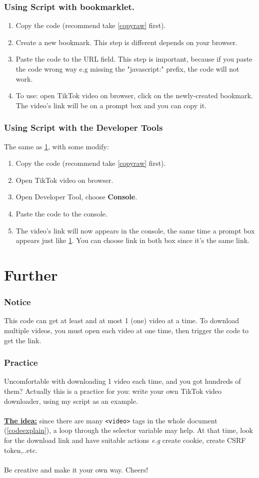 \documentclass{article}
\begin{document}
\section{Using Script with bookmarklet.}\label{bookmarklet}
\begin{enumerate}
\item Copy the code (recommend take \ref{copyraw} first).
\item Create a new bookmark. This step is different depends on your browser.
\item Paste the code to the URL field. This step is important, because if you paste the code wrong way e.g missing the "javascript:" prefix, the code will not work.
\item To use: open TikTok video on browser, click on the newly-created bookmark. The video's link will be on a prompt box and you can copy it.
\end{enumerate}

\section{Using Script with the Developer Tools}
The same as \ref{bookmarklet}, with some modify:
\begin{enumerate}
\item Copy the code (recommend take \ref{copyraw} first).
\item Open TikTok video on browser.
\item Open Developer Tool, choose \textbf{Console}.
\item Paste the code to the console.
\item The video's link will now appears in the console, the same time a prompt box appears just like \ref{bookmarklet}. You can choose link in both box since it's the same link.
\end{enumerate}

\part{Further}
\section{Notice}
This code can get at least and at most 1 (one) video at a time. To download multiple videos, you must open each video at one time, then trigger the code to get the link.
\section{Practice}
Uncomfortable with downloading 1 video each time, and you got hundreds of them? Actually this is a practice for you: write your own TikTok video downloader, using my script as an example.
\\\\
\underline{\textbf{The idea:}} since there are many \verb|<video>| tags in the whole document (\ref{codeexplain}), a loop through the selector variable may help. At that time, look for the download link and have suitable actions \textit{e.g} create cookie, create CSRF token,..etc.
\\\\
Be creative and make it your own way. Cheers!
\end{document}
